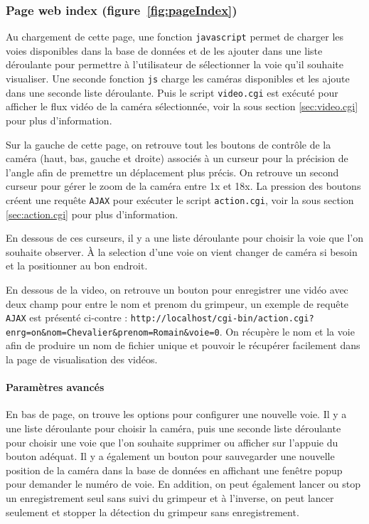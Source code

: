 \documentclass[a4paper, 11pt, french]{article}
\begin{document}
\subsubsection{Page web index (figure~\ref{fig:pageIndex})}
Au chargement de cette page, une fonction \texttt{javascript} permet de charger les voies disponibles dans la base de données et de les ajouter dans une liste déroulante pour permettre à l'utilisateur de sélectionner la voie qu'il souhaite visualiser. Une seconde fonction \texttt{js} charge les caméras disponibles et les ajoute dans une seconde liste déroulante. Puis le script \texttt{video.cgi} est exécuté pour afficher le flux vidéo de la caméra sélectionnée, voir la sous section \ref{sec:video.cgi} pour plus d'information.


Sur la gauche de cette page, on retrouve tout les boutons de contrôle de la caméra (haut, bas, gauche et droite) associés à un curseur pour la précision de l'angle afin de premettre un déplacement plus précis. On retrouve un second curseur pour gérer le zoom de la caméra entre 1x et 18x. La pression des boutons créent une requête \texttt{AJAX} pour exécuter le script \texttt{action.cgi}, voir la sous section \ref{sec:action.cgi} pour plus d'information.


En dessous de ces curseurs, il y a une liste déroulante pour choisir la voie que l'on souhaite observer. À la selection d'une voie on vient changer de caméra si besoin et la positionner au bon endroit.

En dessous de la video, on retrouve un bouton pour enregistrer une vidéo avec deux champ pour entre le nom et prenom du grimpeur, un exemple de requête \texttt{AJAX} est présenté ci-contre : \texttt{http://localhost/cgi-bin/action.cgi?enrg=on\&nom=Chevalier\&prenom=Romain\&voie=0}. On récupère le nom et la voie afin de produire un nom de fichier unique et pouvoir le récupérer facilement dans la page de visualisation des vidéos.



\paragraph{Paramètres avancés}  En bas de page, on trouve les options pour configurer une nouvelle voie. Il y a une liste déroulante pour choisir la caméra, puis une seconde liste déroulante pour choisir une voie que l'on souhaite supprimer ou afficher sur l'appuie du bouton adéquat. Il y a également un bouton pour sauvegarder une nouvelle position de la caméra dans la base de données en affichant une fenêtre popup pour demander le numéro de voie. 
En addition, on peut également lancer ou stop un enregistrement seul sans suivi du grimpeur et à l'inverse, on peut lancer seulement et stopper la détection du grimpeur sans enregistrement.
\end{document}

